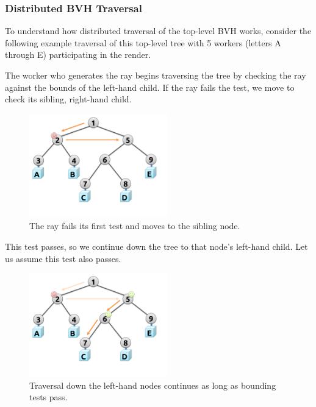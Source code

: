 \documentclass[a4paper,twoside]{article}
\begin{document}
\subsubsection{Distributed BVH Traversal}
\label{traversal}

To understand how distributed traversal of the top-level BVH works, consider
the following example traversal of this top-level tree with 5 workers (letters
A through E) participating in the render.


The worker who generates the ray begins traversing the tree by checking the ray
against the bounds of the left-hand child. If the ray fails the test, we move
to check its sibling, right-hand child.

\begin{figure}[h!]
    \centering
    \includegraphics[width=60mm]{figures/traversal2.pdf}

    \caption{The ray fails its first test and moves to the sibling node.}
    \label{fig:traversal2}
\end{figure}

This test passes, so we continue down the tree to that node's left-hand child.
Let us assume this test also passes.

\begin{figure}[h!]
    \centering
    \includegraphics[width=60mm]{figures/traversal3.pdf}

    \caption{Traversal down the left-hand nodes continues as long as bounding tests pass.}
    \label{fig:traversal3}
\end{figure}
\end{document}
